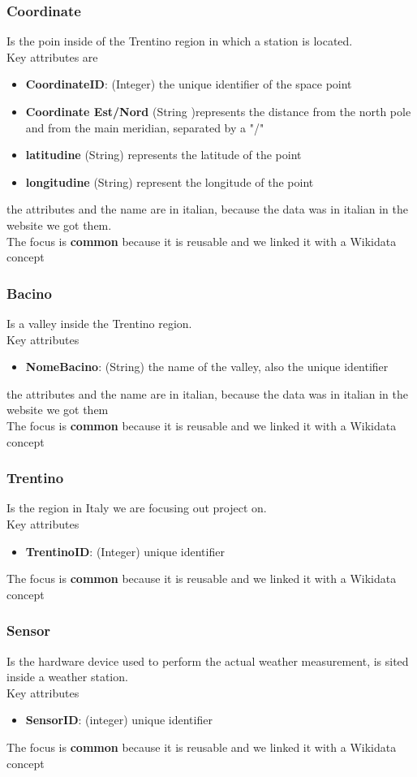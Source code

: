 \subsubsection{Coordinate}
Is the poin inside of the Trentino region in which a station is located.\\
Key attributes are
\begin{itemize}
    \item \textbf{CoordinateID}: (Integer) the unique identifier of the space point
    \item \textbf{Coordinate Est/Nord} (String )represents the distance from the north pole and from the main meridian, separated by a "/"
    \item \textbf{latitudine} (String) represents the latitude of the point
    \item \textbf{longitudine} (String) represent the longitude of the point
\end{itemize}
the attributes and the name are in italian, because the data was in italian in the website we got them.\\
The focus is \textbf{common} because it is reusable and we linked it with a Wikidata concept
\subsubsection{Bacino}
Is a valley inside the Trentino region.\\
Key attributes
\begin{itemize}
    \item \textbf{NomeBacino}: (String) the name of the valley, also the unique identifier
\end{itemize}
the attributes and the name are in italian, because the data was in italian in the website we got them\\
The focus is \textbf{common} because it is reusable and we linked it with a Wikidata concept
\subsubsection{Trentino}
Is the region in Italy we are focusing out project on.\\
Key attributes
\begin{itemize}
    \item \textbf{TrentinoID}: (Integer) unique identifier
\end{itemize}
The focus is \textbf{common} because it is reusable and we linked it with a Wikidata concept
\subsubsection{Sensor}
Is the hardware device used to perform the actual weather measurement, is sited inside a weather station.\\
Key attributes
\begin{itemize}
    \item \textbf{SensorID}: (integer) unique identifier
\end{itemize}
The focus is \textbf{common} because it is reusable and we linked it with a Wikidata concept
